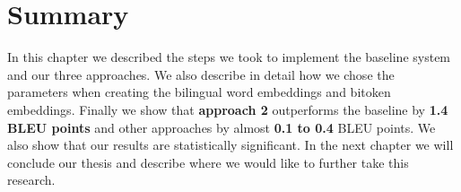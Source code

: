 \section{Summary}
In this chapter we described the steps we took to implement the baseline system~\cite{Stewart2014} and our three approaches. We also describe in detail how we chose the parameters when creating the bilingual word embeddings and bitoken embeddings. Finally we show that \textbf{approach 2} outperforms the baseline by \textbf{1.4 BLEU points} and other approaches by almost \textbf{0.1 to 0.4} BLEU points. We also show that our results are statistically significant. In the next chapter we will conclude our thesis and describe where we would like to further take this research.